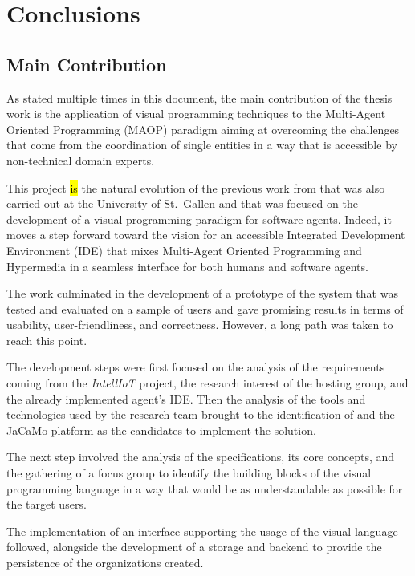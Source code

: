 \chapter*{Conclusions}

\section*{Main Contribution}
As stated multiple times in this document, the main contribution of the thesis work is the application of visual programming techniques to the Multi-Agent Oriented Programming (MAOP) paradigm aiming at overcoming the challenges that come from the coordination of single entities in a way that is accessible by non-technical domain experts.

This project \hl{is} the natural evolution of the previous work from \cite{burattini2022agent} that was also carried out at the University of St.\ Gallen and that was focused on the development of a visual programming paradigm for software agents.
Indeed, it moves a step forward toward the vision for an accessible Integrated Development Environment (IDE) that mixes Multi-Agent Oriented Programming and Hypermedia in a seamless interface for both humans and software agents.

The work culminated in the development of a prototype of the system that was tested and evaluated on a sample of users and gave promising results in terms of usability, user-friendliness, and correctness.
However, a long path was taken to reach this point.

The development steps were first focused on the analysis of the requirements coming from the \textit{IntellIoT} project, the research interest of the hosting group, and the already implemented agent's IDE.
Then the analysis of the tools and technologies used by the research team brought to the identification of \moise{} and the JaCaMo platform as the candidates to implement the solution.

The next step involved the analysis of the \moise{} specifications, its core concepts, and the gathering of a focus group to identify the building blocks of the visual programming language in a way that would be as understandable as possible for the target users.

The implementation of an interface supporting the usage of the visual language followed, alongside the development of a storage and backend to provide the persistence of the organizations created.

